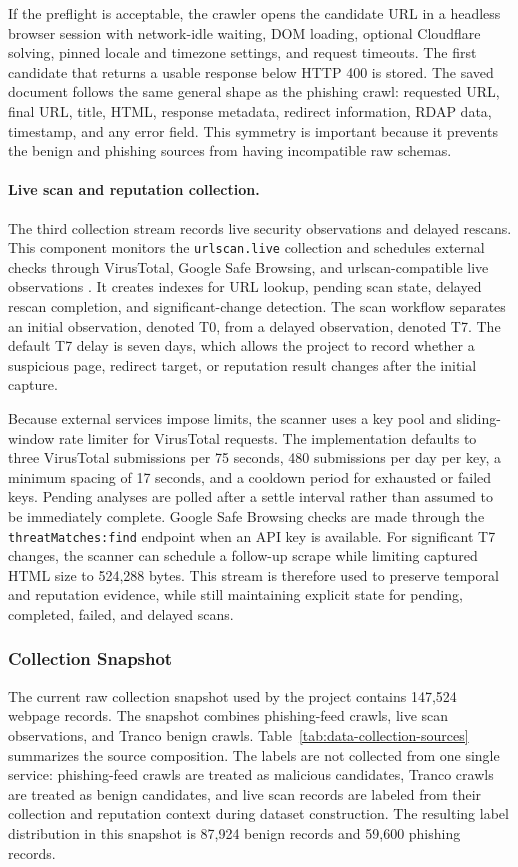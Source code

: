 \documentclass[12pt,letterpaper]{article}
\begin{document}
If the preflight is acceptable, the crawler opens the candidate URL in a headless browser session with network-idle waiting, DOM loading, optional Cloudflare solving, pinned locale and timezone settings, and request timeouts. The first candidate that returns a usable response below HTTP 400 is stored. The saved document follows the same general shape as the phishing crawl: requested URL, final URL, title, HTML, response metadata, redirect information, RDAP data, timestamp, and any error field. This symmetry is important because it prevents the benign and phishing sources from having incompatible raw schemas.

\paragraph{Live scan and reputation collection.}
The third collection stream records live security observations and delayed rescans. This component monitors the \texttt{urlscan.live} collection and schedules external checks through VirusTotal, Google Safe Browsing, and urlscan-compatible live observations \cite{virustotaldocs,urlscandocs,gsbdocs}. It creates indexes for URL lookup, pending scan state, delayed rescan completion, and significant-change detection. The scan workflow separates an initial observation, denoted T0, from a delayed observation, denoted T7. The default T7 delay is seven days, which allows the project to record whether a suspicious page, redirect target, or reputation result changes after the initial capture.

Because external services impose limits, the scanner uses a key pool and sliding-window rate limiter for VirusTotal requests. The implementation defaults to three VirusTotal submissions per 75 seconds, 480 submissions per day per key, a minimum spacing of 17 seconds, and a cooldown period for exhausted or failed keys. Pending analyses are polled after a settle interval rather than assumed to be immediately complete. Google Safe Browsing checks are made through the \texttt{threatMatches:find} endpoint when an API key is available. For significant T7 changes, the scanner can schedule a follow-up scrape while limiting captured HTML size to 524,288 bytes. This stream is therefore used to preserve temporal and reputation evidence, while still maintaining explicit state for pending, completed, failed, and delayed scans.

\subsubsection{Collection Snapshot}
The current raw collection snapshot used by the project contains 147,524 webpage records. The snapshot combines phishing-feed crawls, live scan observations, and Tranco benign crawls. Table~\ref{tab:data-collection-sources} summarizes the source composition. The labels are not collected from one single service: phishing-feed crawls are treated as malicious candidates, Tranco crawls are treated as benign candidates, and live scan records are labeled from their collection and reputation context during dataset construction. The resulting label distribution in this snapshot is 87,924 benign records and 59,600 phishing records.
\end{document}
